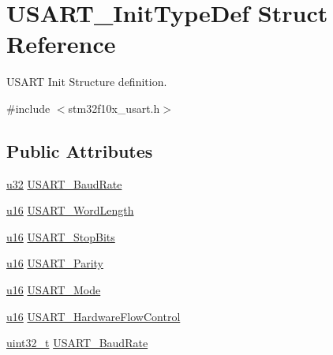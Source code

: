 \hypertarget{struct_u_s_a_r_t___init_type_def}{}\section{U\+S\+A\+R\+T\+\_\+\+Init\+Type\+Def Struct Reference}
\label{struct_u_s_a_r_t___init_type_def}


U\+S\+A\+RT Init Structure definition.  




{\ttfamily \#include $<$stm32f10x\+\_\+usart.\+h$>$}

\subsection*{Public Attributes}
\begin{DoxyCompactItemize}
\item 
\hyperlink{agilefox_2library_2inc_2stm32f10x__type_8h_a2caf5cd7bcdbe1eefa727f44ffb10bac}{u32} \hyperlink{struct_u_s_a_r_t___init_type_def_a55c1e540e3436dff7ae5bf0aad3a0f7f}{U\+S\+A\+R\+T\+\_\+\+Baud\+Rate}
\item 
\hyperlink{agilefox_2library_2inc_2stm32f10x__type_8h_a9e6c91d77e24643b888dbd1a1a590054}{u16} \hyperlink{struct_u_s_a_r_t___init_type_def_a060220f98ef8038e8fbca0c957b06c69}{U\+S\+A\+R\+T\+\_\+\+Word\+Length}
\item 
\hyperlink{agilefox_2library_2inc_2stm32f10x__type_8h_a9e6c91d77e24643b888dbd1a1a590054}{u16} \hyperlink{struct_u_s_a_r_t___init_type_def_af665896ffd0234704ff30fc4df61565f}{U\+S\+A\+R\+T\+\_\+\+Stop\+Bits}
\item 
\hyperlink{agilefox_2library_2inc_2stm32f10x__type_8h_a9e6c91d77e24643b888dbd1a1a590054}{u16} \hyperlink{struct_u_s_a_r_t___init_type_def_adc923fbe7f5e9e020b1c076b8bfd729d}{U\+S\+A\+R\+T\+\_\+\+Parity}
\item 
\hyperlink{agilefox_2library_2inc_2stm32f10x__type_8h_a9e6c91d77e24643b888dbd1a1a590054}{u16} \hyperlink{struct_u_s_a_r_t___init_type_def_ab4f2a4bab37b5c96876cc4a9435f2dd7}{U\+S\+A\+R\+T\+\_\+\+Mode}
\item 
\hyperlink{agilefox_2library_2inc_2stm32f10x__type_8h_a9e6c91d77e24643b888dbd1a1a590054}{u16} \hyperlink{struct_u_s_a_r_t___init_type_def_a54feb80b22c0fd865f321ef3408bf79d}{U\+S\+A\+R\+T\+\_\+\+Hardware\+Flow\+Control}
\item 
\hyperlink{_p_e___types_8h_a33594304e786b158f3fb30289278f5af}{uint32\+\_\+t} \hyperlink{struct_u_s_a_r_t___init_type_def_a6f763cb0e6044f838ee764ce437997b2}{U\+S\+A\+R\+T\+\_\+\+Baud\+Rate}

\end{DoxyCompactItemize}
